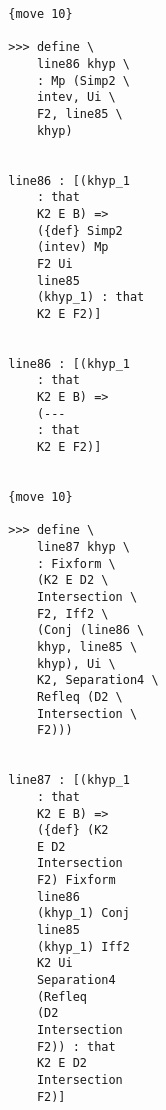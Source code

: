 \documentclass[12pt]{article}
\begin{document}
\begin{verbatim}
                                 {move 10}

                                 >>> define \
                                     line86 khyp \
                                     : Mp (Simp2 \
                                     intev, Ui \
                                     F2, line85 \
                                     khyp)


                                 line86 : [(khyp_1 
                                     : that 
                                     K2 E B) => 
                                     ({def} Simp2 
                                     (intev) Mp 
                                     F2 Ui 
                                     line85 
                                     (khyp_1) : that 
                                     K2 E F2)]


                                 line86 : [(khyp_1 
                                     : that 
                                     K2 E B) => 
                                     (--- 
                                     : that 
                                     K2 E F2)]


                                 {move 10}

                                 >>> define \
                                     line87 khyp \
                                     : Fixform \
                                     (K2 E D2 \
                                     Intersection \
                                     F2, Iff2 \
                                     (Conj (line86 \
                                     khyp, line85 \
                                     khyp), Ui \
                                     K2, Separation4 \
                                     Refleq (D2 \
                                     Intersection \
                                     F2)))


                                 line87 : [(khyp_1 
                                     : that 
                                     K2 E B) => 
                                     ({def} (K2 
                                     E D2 
                                     Intersection 
                                     F2) Fixform 
                                     line86 
                                     (khyp_1) Conj 
                                     line85 
                                     (khyp_1) Iff2 
                                     K2 Ui 
                                     Separation4 
                                     (Refleq 
                                     (D2 
                                     Intersection 
                                     F2)) : that 
                                     K2 E D2 
                                     Intersection 
                                     F2)]



\end{verbatim}
\end{document}
